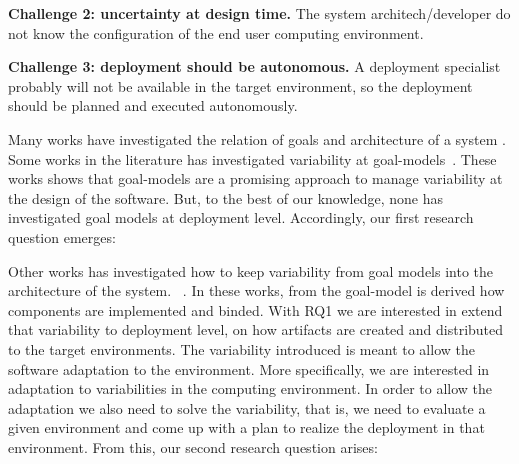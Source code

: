 \textbf{ Challenge 2: uncertainty at design time.} The system architech/developer do not know the configuration of the end user computing environment.

\textbf{ Challenge 3: deployment should be autonomous.} A deployment specialist probably will not be available in the target environment, so the deployment should be planned and executed autonomously.




Many works have investigated the relation of goals and architecture of a system \cite{van_lamsweerde_system_2003}\citep{penserini_design_2007}\cite{morandini_towards_2008}\cite{pimentel_deriving_2012}.
Some works in the literature has investigated variability at goal-models~\cite{yu_goals_2008}\cite{ali_requirements-driven_2014}\cite{angelopoulos_capturing_2015}. These works shows that goal-models are a promising approach to manage variability at the design of the software. But, to the best of our knowledge, none has investigated goal models at deployment level.
Accordingly, our first research question emerges:

 \setlength{\fboxsep}{10pt}
 \noindent{}\bigskip


Other works has investigated how to keep variability from goal models into the architecture of the system. ~\cite{yu_goals_2008}\cite{angelopoulos_capturing_2015}. In these works, from the goal-model is derived how components are implemented and binded. With RQ1 we are interested in extend that variability to deployment level, on how artifacts are created and distributed to the target environments. The variability introduced is meant to allow the software adaptation to the environment. More specifically, we are interested in adaptation to variabilities in the computing environment. In order to allow the adaptation we also need to solve the variability, that is, we need to evaluate a given environment and come up with a plan to realize the deployment in that environment. From this, our second research question arises:

\setlength{\fboxsep}{10pt}
\noindent{}\bigskip



